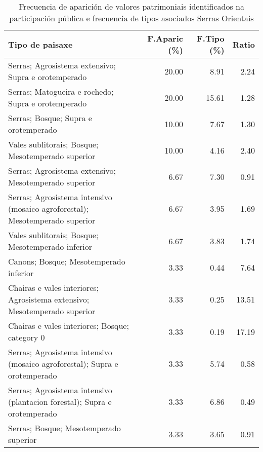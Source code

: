 \begin{table}[p]
\centering
\caption{Frecuencia de aparición de valores patrimoniais identificados na participación pública e frecuencia de tipos asociados Serras Orientais} 
\label{vsixotpat5}
\begin{tabular}{lrrr}
  \hline
Tipo de paisaxe & F.Aparic (\%) & F.Tipo (\%) & Ratio \\ 
  \hline
Serras; Agrosistema extensivo; Supra e orotemperado & 20.00 & 8.91 & 2.24 \\ 
  Serras; Matogueira e rochedo; Supra e orotemperado & 20.00 & 15.61 & 1.28 \\ 
  Serras; Bosque; Supra e orotemperado & 10.00 & 7.67 & 1.30 \\ 
  Vales sublitorais; Bosque; Mesotemperado superior & 10.00 & 4.16 & 2.40 \\ 
  Serras; Agrosistema extensivo; Mesotemperado superior & 6.67 & 7.30 & 0.91 \\ 
  Serras; Agrosistema intensivo (mosaico agroforestal); Mesotemperado superior & 6.67 & 3.95 & 1.69 \\ 
  Vales sublitorais; Bosque; Mesotemperado inferior & 6.67 & 3.83 & 1.74 \\ 
  Canons; Bosque; Mesotemperado inferior & 3.33 & 0.44 & 7.64 \\ 
  Chairas e vales interiores; Agrosistema extensivo; Mesotemperado superior & 3.33 & 0.25 & 13.51 \\ 
  Chairas e vales interiores; Bosque; category 0 & 3.33 & 0.19 & 17.19 \\ 
  Serras; Agrosistema intensivo (mosaico agroforestal); Supra e orotemperado & 3.33 & 5.74 & 0.58 \\ 
  Serras; Agrosistema intensivo (plantacion forestal); Supra e orotemperado & 3.33 & 6.86 & 0.49 \\ 
  Serras; Bosque; Mesotemperado superior & 3.33 & 3.65 & 0.91 \\ 
   \hline
\end{tabular}
\end{table}

